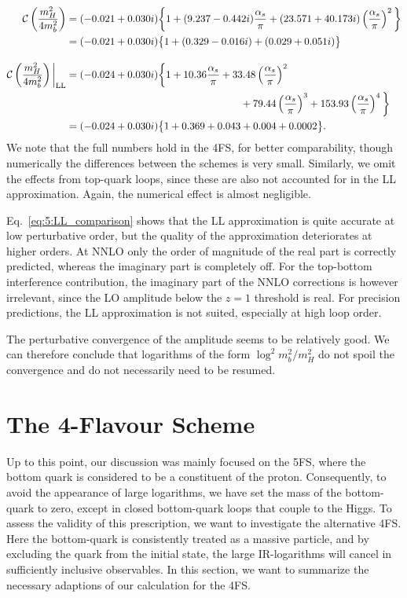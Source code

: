 \begin{equation}
\begin{split}
\mathcal{C} \left(\frac{m_H^2}{4 m_b^2}\right) &= (-0.021 + 0.030 i) \bigg \lbrace 1 + (9.237 - 0.442 i) \frac{\alphas}{\pi} + (23.571 + 40.173 i) \left(\frac{\alphas}{\pi} \right)^2 \bigg \rbrace \\
&= (-0.021 + 0.030 i) \big \lbrace 1 + (0.329 - 0.016 i) + (0.029 + 0.051 i) \big \rbrace \\[10pt]
%
\mathcal{C} \left(\frac{m_H^2}{4 m_b^2} \right) \bigg \vert_{\text{LL}} &= (-0.024 + 0.030 i) \bigg \lbrace 1 + 10.36 \frac{\alphas}{\pi} + 33.48 \left(\frac{\alphas}{\pi} \right)^2  \\
&\hspace{6cm} + 79.44 \left(\frac{\alphas}{\pi}\right)^3 + 153.93 \left( \frac{\alphas}{\pi} \right)^4 \bigg \rbrace \\
&= (-0.024 + 0.030 i) \big \lbrace 1 + 0.369 + 0.043 + 0.004 + 0.0002 \big \rbrace .
\end{split}
\label{eq:5:LL_comparison}
\end{equation}
We note that the full numbers hold in the 4\acs{FS}, for better comparability, though numerically the differences between the schemes is very small. Similarly, we omit the effects from top-quark loops, since these are also not accounted for in the \acs{LL} approximation. Again, the numerical effect is almost negligible.

Eq.~\eqref{eq:5:LL_comparison} shows that the \acs{LL} approximation is quite accurate at low perturbative order, but the quality of the approximation deteriorates at higher orders. At \acs{NNLO} only the order of magnitude of the real part is correctly predicted, whereas the imaginary part is completely off. For the top-bottom interference contribution, the imaginary part of the \acs{NNLO} corrections is however irrelevant, since the \acs{LO} amplitude below the $z=1$ threshold is real. For precision predictions, the \acs{LL} approximation is not suited, especially at high loop order.

The perturbative convergence of the amplitude seems to be relatively good. We can therefore conclude that logarithms of the form $\log^2 m_b^2/m_H^2$ do not spoil the convergence and do not necessarily need to be resumed.



\section{The 4-Flavour Scheme}\label{sec:5:4FS}
Up to this point, our discussion was mainly focused on the 5\acs{FS}, where the bottom quark is considered to be a constituent of the proton. Consequently, to avoid the appearance of large logarithms, we have set the mass of the bottom-quark to zero, except in closed bottom-quark loops that couple to the Higgs. To assess the validity of this prescription, we want to investigate the alternative 4\acs{FS}. Here the bottom-quark is consistently treated as a massive particle, and by excluding the quark from the initial state, the large \acs{IR}-logarithms will cancel in sufficiently inclusive observables. In this section, we want to summarize the necessary adaptions of our calculation for the 4\acs{FS}.

